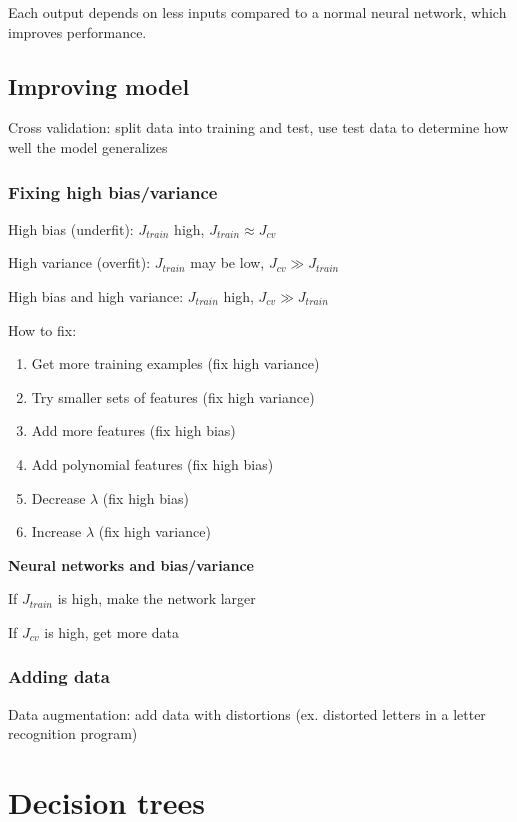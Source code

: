 \documentclass[12pt]{article}
\begin{document}
Each output depends on less inputs compared to a normal neural network, which improves
performance.

\subsection{Improving model}

Cross validation: split data into training and test, use test data to determine how well the model generalizes

\subsubsection{Fixing high bias/variance}

High bias (underfit): $J_{train}$ high, $J_{train} \approx J_{cv}$

High variance (overfit): $J_{train}$ may be low, $J_{cv} \gg J_{train}$

High bias and high variance: $J_{train}$ high, $J_{cv} \gg J_{train}$

How to fix:

\begin{enumerate}
\item Get more training examples (fix high variance)
\item Try smaller sets of features (fix high variance)
\item Add more features (fix high bias)
\item Add polynomial features (fix high bias)
\item Decrease $\lambda$ (fix high bias)
\item Increase $\lambda$ (fix high variance)
\end{enumerate}

\textbf{Neural networks and bias/variance}

If $J_{train}$ is high, make the network larger

If $J_{cv}$ is high, get more data

\subsubsection{Adding data}

Data augmentation: add data with distortions (ex. distorted letters in a letter recognition program)

\section{Decision trees}
\end{document}
